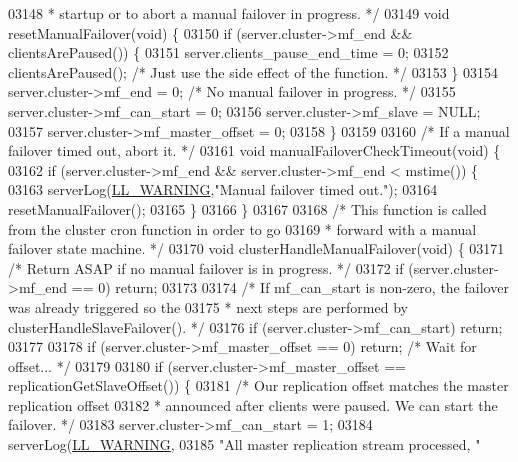 \begin{DoxyCode}
{{{{{{{{{{{{{{{{{{{{{{{{{{{{{{{{{{{{{{{{{{{{{{{{{{{{{{{{{03148 \textcolor{comment}{ * startup or to abort a manual failover in progress. */}
03149 \textcolor{keywordtype}{void} resetManualFailover(\textcolor{keywordtype}{void}) \{
03150     \textcolor{keywordflow}{if} (server.cluster->mf\_end && clientsArePaused()) \{
03151         server.clients\_pause\_end\_time = 0;
03152         clientsArePaused(); \textcolor{comment}{/* Just use the side effect of the function. */}
03153     \}
03154     server.cluster->mf\_end = 0; \textcolor{comment}{/* No manual failover in progress. */}
03155     server.cluster->mf\_can\_start = 0;
03156     server.cluster->mf\_slave = NULL;
03157     server.cluster->mf\_master\_offset = 0;
03158 \}
03159 
03160 \textcolor{comment}{/* If a manual failover timed out, abort it. */}
03161 \textcolor{keywordtype}{void} manualFailoverCheckTimeout(\textcolor{keywordtype}{void}) \{
03162     \textcolor{keywordflow}{if} (server.cluster->mf\_end && server.cluster->mf\_end < mstime()) \{
03163         serverLog(\hyperlink{server_8h_a31229b9334bba7d6be2a72970967a14b}{LL\_WARNING},\textcolor{stringliteral}{"Manual failover timed out."});
03164         resetManualFailover();
03165     \}
03166 \}
03167 
03168 \textcolor{comment}{/* This function is called from the cluster cron function in order to go}
03169 \textcolor{comment}{ * forward with a manual failover state machine. */}
03170 \textcolor{keywordtype}{void} clusterHandleManualFailover(\textcolor{keywordtype}{void}) \{
03171     \textcolor{comment}{/* Return ASAP if no manual failover is in progress. */}
03172     \textcolor{keywordflow}{if} (server.cluster->mf\_end == 0) \textcolor{keywordflow}{return};
03173 
03174     \textcolor{comment}{/* If mf\_can\_start is non-zero, the failover was already triggered so the}
03175 \textcolor{comment}{     * next steps are performed by clusterHandleSlaveFailover(). */}
03176     \textcolor{keywordflow}{if} (server.cluster->mf\_can\_start) \textcolor{keywordflow}{return};
03177 
03178     \textcolor{keywordflow}{if} (server.cluster->mf\_master\_offset == 0) \textcolor{keywordflow}{return}; \textcolor{comment}{/* Wait for offset... */}
03179 
03180     \textcolor{keywordflow}{if} (server.cluster->mf\_master\_offset == replicationGetSlaveOffset()) \{
03181         \textcolor{comment}{/* Our replication offset matches the master replication offset}
03182 \textcolor{comment}{         * announced after clients were paused. We can start the failover. */}
03183         server.cluster->mf\_can\_start = 1;
03184         serverLog(\hyperlink{server_8h_a31229b9334bba7d6be2a72970967a14b}{LL\_WARNING},
03185             \textcolor{stringliteral}{"All master replication stream processed, "}
}}}}}}}}}}}}}}}}}}}}}}}}}}}}}}}}}}}}}}}}}}}}}}}}}}}}}}}}}
\end{DoxyCode}
